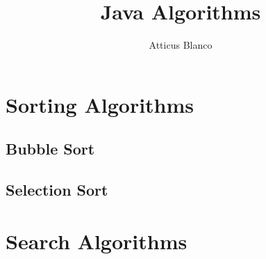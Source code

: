 \documentclass[11pt]{article}
\begin{document}
\title{Java Algorithms}
\author{Atticus Blanco}

\maketitle

    \section{Sorting Algorithms}

        \subsection{Bubble Sort}
            

        \subsection{Selection Sort}
            

    \section{Search Algorithms}
\end{document}
